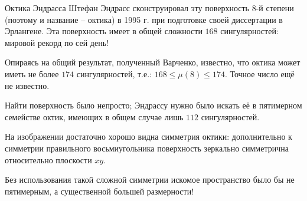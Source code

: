 \begin{surferPage}{Октика Эндрасса}
Штефан Эндрасс сконструировал эту поверхность 8-й степени (поэтому и название – октика) в 1995 г. при подготовке своей диссертации в Эрлангене. Эта поверхность имеет в общей сложности $168$ сингулярностей: мировой рекорд по сей день!
  
     Опираясь на общий результат, полученный Варченко, известно, что октика может иметь не более $174$ сингулярностей, т.е.: $168 \le \mu(8) \le 174$. 
    Точное число ещё не известно.

     Найти поверхность было непросто; Эндрассу нужно было искать её в пятимерном семействе октик, имеющих в общем случае лишь $112$ сингулярностей.

На изображении достаточно хорошо видна симметрия октики: дополнительно к симметрии правильного восьмиугольника поверхность зеркально симметрична относительно плоскости $xy$.

Без использования такой сложной симметрии искомое пространство было бы не пятимерным, а существенной большей размерности!
\end{surferPage}
